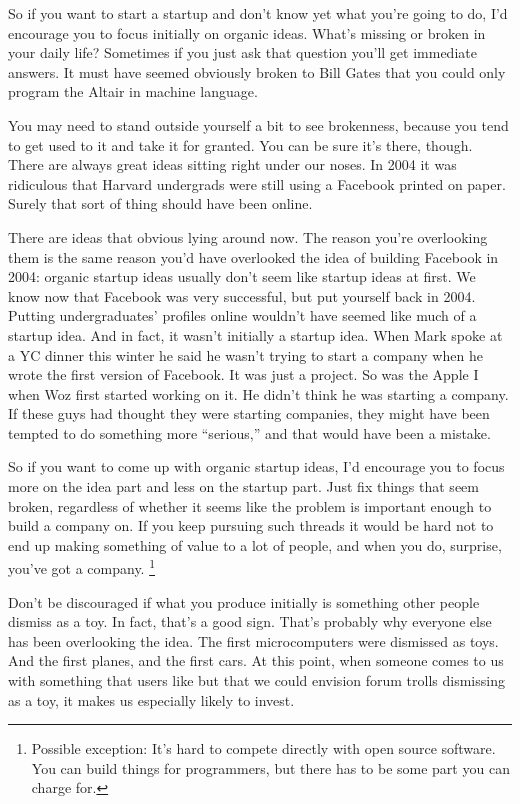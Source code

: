 So if you want to start a startup and don't know yet what you're going
to do, I'd encourage you to focus initially on organic ideas. What's
missing or broken in your daily life? Sometimes if you just ask that
question you'll get immediate answers. It must have seemed obviously
broken to Bill Gates that you could only program the Altair in machine
language.

You may need to stand outside yourself a bit to see brokenness, because
you tend to get used to it and take it for granted. You can be sure it's
there, though. There are always great ideas sitting right under our
noses. In 2004 it was ridiculous that Harvard undergrads were still
using a Facebook printed on paper. Surely that sort of thing should have
been online.

There are ideas that obvious lying around now. The reason you're
overlooking them is the same reason you'd have overlooked the idea of
building Facebook in 2004: organic startup ideas usually don't seem like
startup ideas at first. We know now that Facebook was very successful,
but put yourself back in 2004. Putting undergraduates' profiles online
wouldn't have seemed like much of a startup idea. And in fact, it wasn't
initially a startup idea. When Mark spoke at a YC dinner this winter he
said he wasn't trying to start a company when he wrote the first version
of Facebook. It was just a project. So was the Apple I when Woz first
started working on it. He didn't think he was starting a company. If
these guys had thought they were starting companies, they might have
been tempted to do something more ``serious,'' and that would have been
a mistake.

So if you want to come up with organic startup ideas, I'd encourage you
to focus more on the idea part and less on the startup part. Just fix
things that seem broken, regardless of whether it seems like the problem
is important enough to build a company on. If you keep pursuing such
threads it would be hard not to end up making something of value to a
lot of people, and when you do, surprise, you've got a company.
\footnote{Possible exception: It's hard to compete directly with open
source software. You can build things for programmers, but there has to
be some part you can charge for.}

Don't be discouraged if what you produce initially is something other
people dismiss as a toy. In fact, that's a good sign. That's probably
why everyone else has been overlooking the idea. The first
microcomputers were dismissed as toys. And the first planes, and the
first cars. At this point, when someone comes to us with something that
users like but that we could envision forum trolls dismissing as a toy,
it makes us especially likely to invest.

